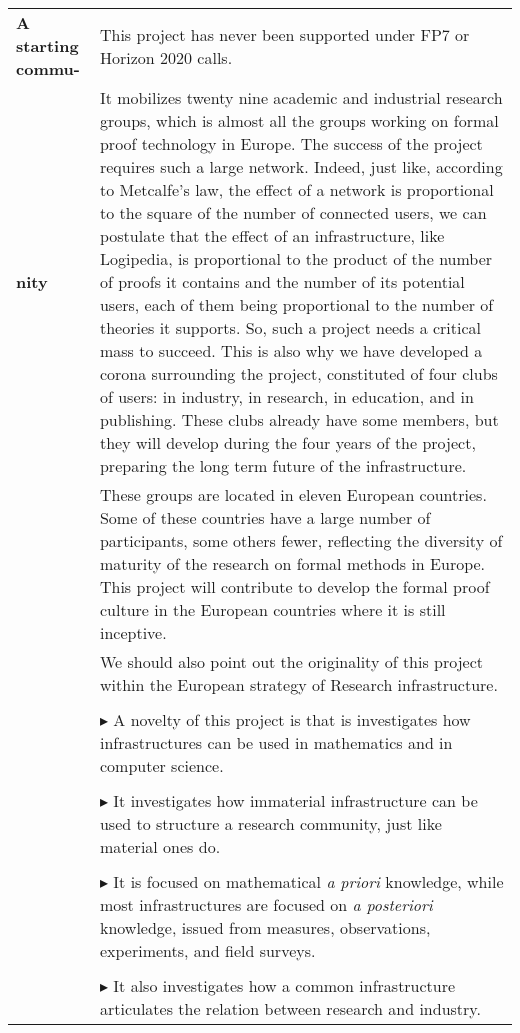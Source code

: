 \begin{longtable}{|p{}|p{}|}
{\bf A starting commu-}
&
This project has never been supported under FP7 or Horizon 2020 calls.\\
{\bf nity} &
\hspace{0.4cm}
It mobilizes twenty nine academic and industrial research groups, which is
almost all the groups working on formal proof technology in Europe.
The success of the project requires such a large network.  Indeed,
just like, according to Metcalfe's law, the effect of a network is
proportional to the square of the number of connected users, we can
postulate that the effect of an infrastructure, like Logipedia, is
proportional to the product of the number of proofs it contains and
the number of its potential users, each of them being proportional to
the number of theories it supports. So, such a project needs a
critical mass to succeed. This is also why we have developed a corona
surrounding the project, constituted of four clubs of users: in
industry, in research, in education, and in publishing. These clubs
already have some members, but they will develop during the four years
of the project, preparing the long term future of the infrastructure.\\
&
\hspace{0.4cm}
These groups are located in eleven European countries.  Some of these
countries have a large number of participants, some others fewer,
reflecting the diversity of maturity of the research on formal methods
in Europe. This project will contribute to develop the formal proof
culture in the European countries where it is still inceptive.\\
&
\hspace{0.4cm}
We should also point out the originality of this project within the
European strategy of Research infrastructure.\\
&\\
&
$\blacktriangleright$ A novelty of this project is that is
investigates how infrastructures can be used in mathematics and in
computer science.\\
&\\
&
$\blacktriangleright$ It investigates how immaterial infrastructure
can be used to structure a research community, just like material ones
do.\\
&\\
&
$\blacktriangleright$ It is focused on mathematical {\em a priori}
knowledge, while most infrastructures are focused on {\em a
  posteriori} knowledge, issued from measures, observations,
experiments, and field surveys.\\
&\\
&
$\blacktriangleright$ It also investigates how a common infrastructure
articulates the relation between research and industry.\\


\end{longtable}
